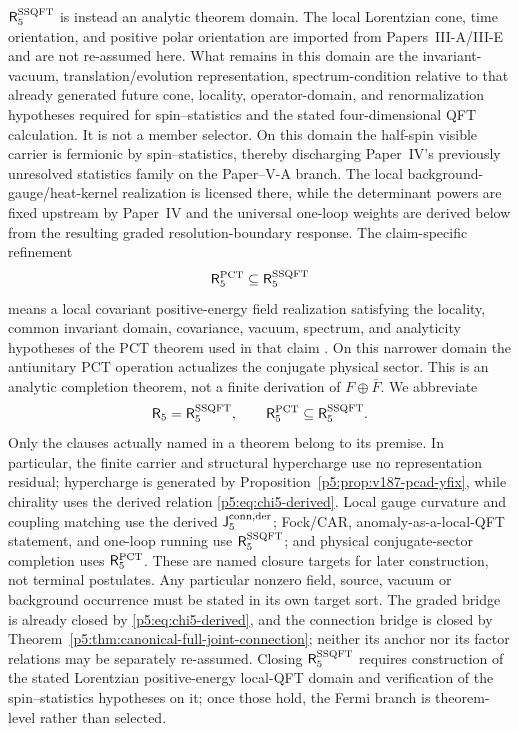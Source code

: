 \documentclass[12pt,a4paper]{article}
\begin{document}
\begin{definition}
\(\mathsf R_5^{\rm SSQFT}\) is instead an analytic theorem domain.  The
local Lorentzian cone, time orientation, and positive polar orientation are
imported from Papers~III-A/III-E and are not re-assumed here.  What remains in
this domain are the invariant-vacuum, translation/evolution representation,
spectrum-condition relative to that already generated future cone, locality,
operator-domain, and renormalization hypotheses required for spin--statistics and the
stated four-dimensional QFT calculation.  It is not a member selector.  On this domain the half-spin visible carrier is fermionic by spin--statistics,
thereby discharging Paper~IV's previously unresolved statistics family on the
Paper--V-A branch.  The local background-gauge/heat-kernel realization is
licensed there, while the determinant powers are fixed upstream by Paper~IV
and the universal one-loop weights are derived below from the resulting
graded resolution-boundary response.  The claim-specific refinement
\begin{equation}
\label{p5:eq:r5-pct}
\mathsf R_5^{\rm PCT}\subseteq\mathsf R_5^{\rm SSQFT}
\end{equation}
means a local covariant positive-energy field realization satisfying the
locality, common invariant domain, covariance, vacuum, spectrum, and
analyticity hypotheses of the PCT theorem used in that claim
\cite{Haag1996}.  On this narrower domain the antiunitary PCT operation
actualizes the conjugate physical sector.  This is an analytic completion
theorem, not a finite derivation of \(F\oplus\bar F\).  We abbreviate
\begin{equation}
\label{p5:eq:omega5-envelope}
\mathsf R_5
=
\mathsf R_5^{\rm SSQFT},
\qquad
\mathsf R_5^{\rm PCT}\subseteq\mathsf R_5^{\rm SSQFT}.
\end{equation}
Only the clauses actually named in a theorem belong to its premise.  In
particular, the finite carrier and structural hypercharge use no representation
residual; hypercharge is generated by Proposition~\ref{p5:prop:v187-pcad-yfix},
while chirality uses the derived relation \eqref{p5:eq:chi5-derived}.  Local
gauge curvature and coupling matching use the derived
\(\mathsf J_5^{\rm conn,der}\); Fock/CAR, anomaly-as-a-local-QFT statement,
and one-loop running use \(\mathsf R_5^{\rm SSQFT}\); and physical
conjugate-sector completion uses \(\mathsf R_5^{\rm PCT}\).  These are named
closure targets for later construction, not terminal postulates.  Any
particular nonzero field, source, vacuum or background occurrence must be
stated in its own target sort.  The graded bridge is
already closed by \eqref{p5:eq:chi5-derived}, and the connection bridge is
closed by Theorem~\ref{p5:thm:canonical-full-joint-connection}; neither its
anchor nor its factor relations may be separately re-assumed.  Closing
\(\mathsf R_5^{\rm SSQFT}\)
requires construction of the stated Lorentzian positive-energy local-QFT
domain and verification of the spin--statistics hypotheses on it; once those
hold, the Fermi branch is theorem-level rather than selected.


\end{definition}
\end{document}
